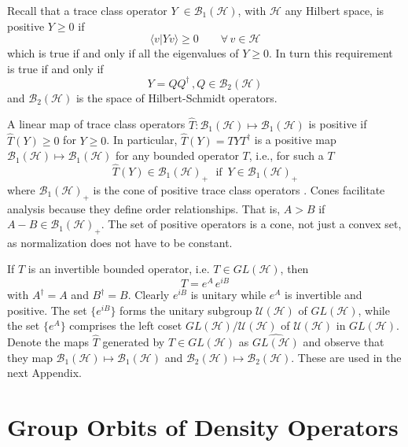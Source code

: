 \documentclass[aps,preprint]{revtex4}%
\begin{document}
\noindent Recall that a trace class operator $Y \; \in\mathcal{B}_{1} (
\mathcal{H})$, with $\mathcal{H}$ any Hilbert space, is positive $Y \ge0$ if
\begin{equation}
\langle v | Y v \rangle\ge0 \qquad\forall\, v \in\mathcal{H}%
\end{equation}
which is true if and only if all the eigenvalues of $Y \ge0$. In turn this
requirement is true if and only if
\begin{equation}
Y = Q Q^{\dagger} \, , Q\in\mathcal{B}_{2} ( \mathcal{H})
\end{equation}
and $\mathcal{B}_{2} ( \mathcal{H})$ is the space of Hilbert-Schmidt operators.

A linear map of trace class operators $\hat{T}:\mathcal{B}_{1}(\mathcal{H}%
)\mapsto\mathcal{B}_{1}(\mathcal{H})$ is positive if $\hat{T}(Y)\geq0$ for
$Y\geq0$. In particular, $\hat{T}(Y)=TYT^{\dagger}$ is a positive map
$\mathcal{B}_{1}(\mathcal{H})\mapsto\mathcal{B}_{1}(\mathcal{H})$ for any
bounded operator $T$, i.e., for such a $T$
\begin{equation}
\hat{T}(Y)\in\mathcal{B}_{1}(\mathcal{H})_{+}\,\,\text{{\ if }}\,Y\in
\mathcal{B}_{1}(\mathcal{H})_{+}%
\end{equation}
where $\mathcal{B}_{1}(\mathcal{H})_{+}$ is the cone of positive trace class
operators \cite{Kummer}. Cones facilitate analysis because they define order
relationships. That is, $A>B$ if $A-B\in\mathcal{B}_{1}(\mathcal{H})_{+}$. The
set of positive operators is a cone, not just a convex set, as normalization
does not have to be constant.

If $T$ is an invertible bounded operator, i.e. $T\in GL(\mathcal{H})$, then
\begin{equation}
T=e^{A}\,e^{iB}%
\end{equation}
with $A^{\dagger}=A$ and $B^{\dagger}=B$. Clearly $e^{iB}$ is unitary while
$e^{A}$ is invertible and positive. The set $\{e^{iB}\}$ forms the unitary
subgroup $\mathcal{U}(\mathcal{H})$ of $GL(\mathcal{H})$, while the set $\{
e^{A}\}$ comprises the left coset $GL(\mathcal{H})/\mathcal{U}(\mathcal{H})$
of $\mathcal{U}(\mathcal{H})$ in $GL(\mathcal{H})$. Denote the maps $\hat{T}$
generated by $T\in GL(\mathcal{H})$ as $\widehat{GL(\mathcal{H})}$ and observe
that they map $\mathcal{B}_{1}(\mathcal{H})\mapsto\mathcal{B}_{1}%
(\mathcal{H})$ and $\mathcal{B}_{2}(\mathcal{H})\mapsto\mathcal{B}%
_{2}(\mathcal{H}).$ These are used in the next Appendix.

\section{Group Orbits of Density Operators}
\end{document}
